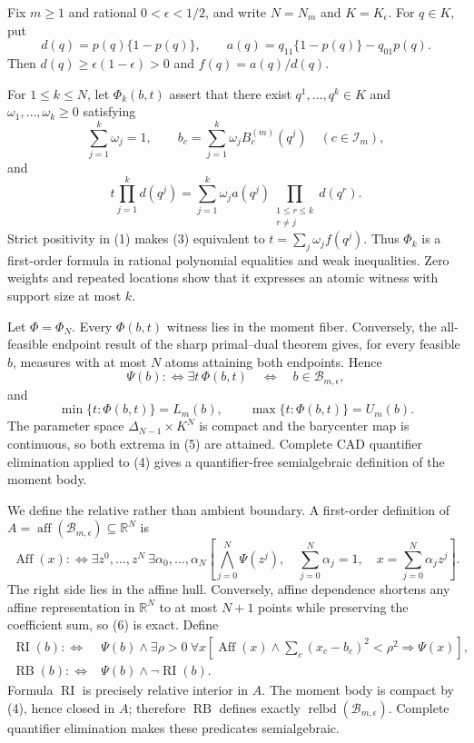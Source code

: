Fix \(m\geq1\) and rational \(0<\epsilon<1/2\), and write \(N=N_m\) and \(K=K_{\epsilon}\).  For \(q\in K\), put
\[
 d(q)=p(q)\{1-p(q)\},
 \qquad a(q)=q_{11}\{1-p(q)\}-q_{01}p(q).
\tag{1}
\]
Then \(d(q)\geq\epsilon(1-\epsilon)>0\) and \(f(q)=a(q)/d(q)\).

For \(1\leq k\leq N\), let \(\Phi_k(b,t)\) assert that there exist \(q^1,\ldots,q^k\in K\) and \(\omega_1,\ldots,\omega_k\geq0\) satisfying
\[
 \sum_{j=1}^k\omega_j=1,
 \qquad
 b_c=\sum_{j=1}^k\omega_jB_c^{(m)}(q^j)
 \quad(c\in\mathcal I_m),
\tag{2}
\]
and
\[
 t\prod_{j=1}^kd(q^j)
 =\sum_{j=1}^k\omega_ja(q^j)
 \prod_{\substack{1\leq r\leq k\\r\neq j}}d(q^r).
\tag{3}
\]
Strict positivity in (1) makes (3) equivalent to \(t=\sum_j\omega_jf(q^j)\).  Thus \(\Phi_k\) is a first-order formula in rational polynomial equalities and weak inequalities.  Zero weights and repeated locations show that it expresses an atomic witness with support size at most \(k\).

Let \(\Phi=\Phi_N\).  Every \(\Phi(b,t)\) witness lies in the moment fiber.  Conversely, the all-feasible endpoint result of the sharp primal--dual theorem gives, for every feasible \(b\), measures with at most \(N\) atoms attaining both endpoints.  Hence
\[
 \Psi(b):\Longleftrightarrow\exists t\,\Phi(b,t)
 \quad\Longleftrightarrow\quad b\in\mathcal B_{m,\epsilon},
\tag{4}
\]
and
\[
 \min\{t:\Phi(b,t)\}=L_m(b),
 \qquad
 \max\{t:\Phi(b,t)\}=U_m(b).
\tag{5}
\]
The parameter space \(\Delta_{N-1}\times K^N\) is compact and the barycenter map is continuous, so both extrema in (5) are attained.  Complete CAD quantifier elimination applied to (4) gives a quantifier-free semialgebraic definition of the moment body.

We define the relative rather than ambient boundary.  A first-order definition of \(A=\operatorname{aff}(\mathcal B_{m,\epsilon})\subseteq\mathbb R^N\) is
\[
 \operatorname{Aff}(x):\Longleftrightarrow
 \exists z^0,\ldots,z^N\ \exists\alpha_0,\ldots,\alpha_N
 \left[
 \bigwedge_{j=0}^N\Psi(z^j),\quad
 \sum_{j=0}^N\alpha_j=1,\quad
 x=\sum_{j=0}^N\alpha_jz^j
 \right].
\tag{6}
\]
The right side lies in the affine hull.  Conversely, affine dependence shortens any affine representation in \(\mathbb R^N\) to at most \(N+1\) points while preserving the coefficient sum, so (6) is exact.  Define
\[
 \begin{split}
 \operatorname{RI}(b):\Longleftrightarrow{}&\Psi(b)\wedge
 \exists\rho>0\ \forall x\left[
 \operatorname{Aff}(x)\wedge\sum_c(x_c-b_c)^2<\rho^2
 \Rightarrow\Psi(x)\right],\\
 \operatorname{RB}(b):\Longleftrightarrow{}&\Psi(b)\wedge\neg\operatorname{RI}(b).
 \end{split}
\tag{7}
\]
Formula \(\operatorname{RI}\) is precisely relative interior in \(A\).  The moment body is compact by (4), hence closed in \(A\); therefore \(\operatorname{RB}\) defines exactly \(\operatorname{relbd}(\mathcal B_{m,\epsilon})\).  Complete quantifier elimination makes these predicates semialgebraic.

